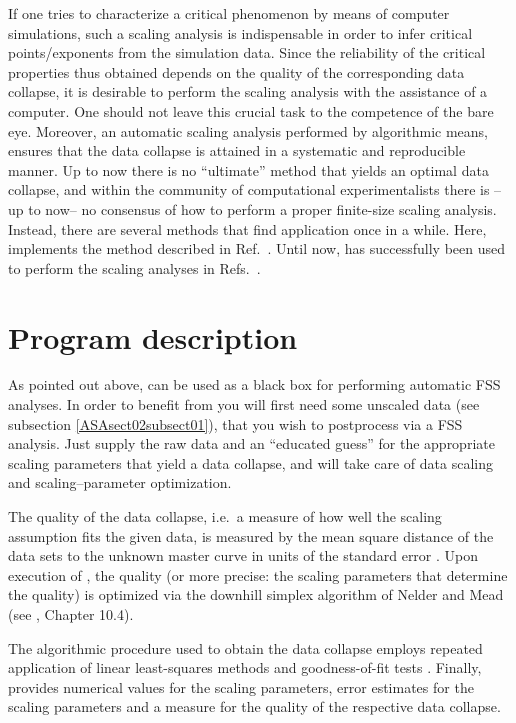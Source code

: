 If one tries to characterize a critical phenomenon by means of computer simulations, such 
a scaling analysis is indispensable in order to infer critical points/exponents
from the simulation data.
Since the reliability of the critical properties thus obtained depends 
on the quality of the corresponding data collapse, it is desirable to 
perform the scaling analysis with the assistance of a computer. One
should not leave this crucial task to the competence of the bare eye.
Moreover, an automatic scaling analysis performed by algorithmic means,
ensures that the data collapse is attained in a systematic and
reproducible manner.
Up to now there is no ``ultimate'' method that yields an optimal data 
collapse, and within the community of computational experimentalists
there is --up to now-- no consensus of how to perform a proper finite-size 
scaling analysis. Instead, there are several methods 
\cite{ASAhoudayer2004,ASAbhattacharjee2001,ASAkawashima1993,ASAwenzel2008,ASAwinter2008} that find 
application once in a while. 
Here, \myProg{} implements the method described in Ref.\ \cite{ASAhoudayer2004}.
Until now, \myProg{} has successfully been used to perform the scaling analyses in 
Refs.\ \cite{ASAmelchert2008,ASAapolo2009,ASAmelchert2009,ASAwolfsheimer2009}.

\section{Program description}
\label{ASAsect02}

As pointed out above, \myProg{} can be used as a black box for performing automatic FSS analyses. 
In order to benefit from \myProg{} you will first need some unscaled data (see subsection \ref{ASAsect02subsect01}), 
that you wish to postprocess via a FSS analysis. 
Just supply the raw data and an ``educated guess'' for the appropriate scaling parameters
that yield a data collapse, and \myProg{} will take care of data scaling and scaling--parameter optimization. 

The quality of the data collapse, i.e.\ a measure of how well the scaling assumption fits the given data, 
is measured by the mean square distance of the data sets to the unknown master curve in units of the 
standard error \cite{ASAhoudayer2004}.
Upon execution of \myProg{}, the quality (or more precise: the scaling parameters that determine the quality)
is optimized via the downhill simplex algorithm of Nelder and Mead (see \cite{ASAnum_rec}, Chapter 10.4). 

The algorithmic procedure used to obtain the data collapse employs repeated application of linear 
least-squares methods \cite{ASAnum_rec} and goodness-of-fit tests \cite{ASAnum_rec,ASApractical_guide}.
Finally, \myProg{} provides numerical values for the scaling parameters, error estimates for the 
scaling parameters and a measure for the quality of the respective data collapse.

